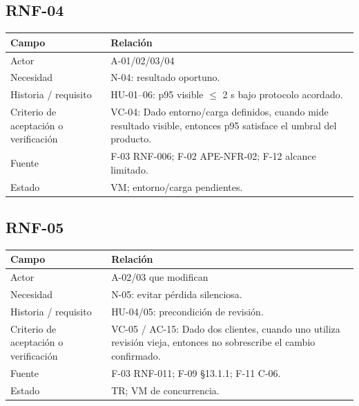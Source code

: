 \documentclass[12pt,a4paper]{report}
\begin{document}
\subsection{RNF-04}\label{matriz-RNF-04}

{\def\LTcaptype{none} %
\begin{longtable}[]{@{}
  >{\raggedright\arraybackslash}p{}
  >{\raggedright\arraybackslash}p{}@{}}
\toprule\noalign{}
\begin{minipage}[b]{\linewidth}\raggedright
Campo
\end{minipage} & \begin{minipage}[b]{\linewidth}\raggedright
Relación
\end{minipage} \\
\midrule\noalign{}
\endhead
\bottomrule\noalign{}
\endlastfoot
Actor & A-01/02/03/04 \\
Necesidad & N-04: resultado oportuno. \\
Historia / requisito & HU-01--06: p95 visible \ensuremath{\leq} 2 s bajo protocolo
acordado. \\
Criterio de aceptación o verificación & VC-04: Dado entorno/carga
definidos, cuando mide resultado visible, entonces p95 satisface el
umbral del producto. \\
Fuente & F-03 RNF-006; F-02 APE-NFR-02; F-12 alcance limitado. \\
Estado & VM; entorno/carga pendientes. \\
\end{longtable}
}

\subsection{RNF-05}\label{matriz-RNF-05}

{\def\LTcaptype{none} %
\begin{longtable}[]{@{}
  >{\raggedright\arraybackslash}p{}
  >{\raggedright\arraybackslash}p{}@{}}
\toprule\noalign{}
\begin{minipage}[b]{\linewidth}\raggedright
Campo
\end{minipage} & \begin{minipage}[b]{\linewidth}\raggedright
Relación
\end{minipage} \\
\midrule\noalign{}
\endhead
\bottomrule\noalign{}
\endlastfoot
Actor & A-02/03 que modifican \\
Necesidad & N-05: evitar pérdida silenciosa. \\
Historia / requisito & HU-04/05: precondición de revisión. \\
Criterio de aceptación o verificación & VC-05 / AC-15: Dado dos
clientes, cuando uno utiliza revisión vieja, entonces no sobrescribe el
cambio confirmado. \\
Fuente & F-03 RNF-011; F-09 §13.1.1; F-11 C-06. \\
Estado & TR; VM de concurrencia. \\
\end{longtable}
}
\end{document}
